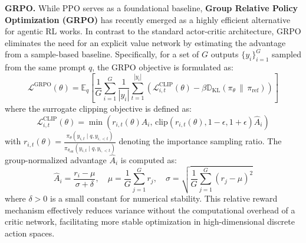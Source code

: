 \textbf{GRPO.} While PPO serves as a foundational baseline, \textbf{Group Relative Policy Optimization (GRPO)} \cite{GRPO} has recently emerged as a highly efficient alternative for agentic RL works. In contrast to the standard actor-critic architecture, GRPO eliminates the need for an explicit value network by estimating the advantage from a sample-based baseline. Specifically, for a set of $G$ outputs $\{y_i\}_{i=1}^G$ sampled from the same prompt $q$, the GRPO objective is formulated as:
\begin{equation}
\mathcal{L}^{\text{GRPO}}(\theta) = \mathbb{E}_{q} \left[ \frac{1}{G} \sum_{i=1}^G \frac{1}{|y_i|} \sum_{t=1}^{|y_i|}\left( \mathcal{L}_{i,t}^{\text{CLIP}}(\theta) - \beta \mathbb{D}_{\text{KL}}(\pi_\theta \,\|\, \pi_{\text{ref}}) \right) \right]
\end{equation}
where the surrogate clipping objective is defined as: \begin{equation} \mathcal{L}_{i,t}^{\text{CLIP}}(\theta) = \min \left( r_{i,t}(\theta) \hat{A}_i, \, \text{clip}(r_{i,t}(\theta), 1-\epsilon, 1+\epsilon) \hat{A}_i \right) 
\end{equation}
with $r_{i,t}(\theta) = \frac{\pi_\theta(y_{i,t} \mid q, y_{i, < t})}{\pi_{\theta_{\text{old}}}(y_{i,t} \mid q, y_{i, < t})}$ denoting the importance sampling ratio.
The group-normalized advantage $\hat{A}_i$ is computed as:
\begin{equation}
\hat{A}_i = \frac{r_i - \mu}{\sigma + \delta}, \quad \mu = \frac{1}{G}\sum_{j=1}^G r_j, \quad \sigma = \sqrt{\frac{1}{G}\sum_{j=1}^G (r_j - \mu)^2}
\end{equation}
where $\delta > 0$ is a small constant for numerical stability. This relative reward mechanism effectively reduces variance without the computational overhead of a critic network, facilitating more stable optimization in high-dimensional discrete action spaces.

